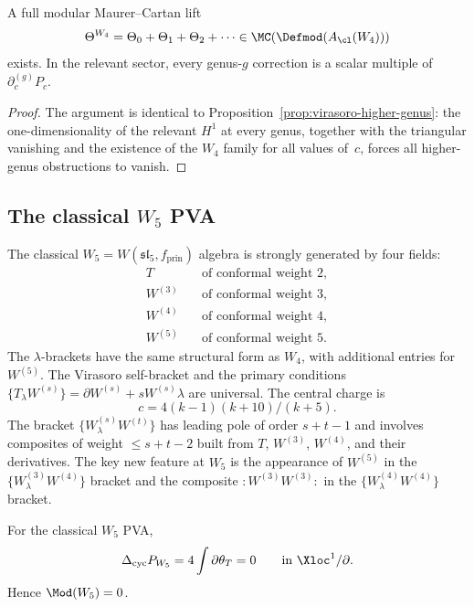 \begin{corollary}
A full modular Maurer--Cartan lift
\[
\Theta^{W_4} = \Theta_0 + \Theta_1 + \Theta_2 + \cdots
\in \MC(\Defmod(A_{\cl}(W_4)))
\]
exists. In the relevant sector, every genus-$g$ correction is a scalar
multiple of $\partial_c^{(g)} P_c$.
\end{corollary}

\begin{proof}
The argument is identical to Proposition~\ref{prop:virasoro-higher-genus}:
the one-dimensionality of the relevant $H^1$ at every genus, together with the
triangular vanishing and the existence of the $W_4$ family for all values of~$c$,
forces all higher-genus obstructions to vanish.
\end{proof}

\subsection{The classical $W_5$ PVA}

\begin{definition}
The classical $W_5 = W(\mathfrak{sl}_5, f_{\mathrm{prin}})$ algebra is
strongly generated by four fields:
\begin{align}
T &\quad\text{of conformal weight }2,\\
W^{(3)} &\quad\text{of conformal weight }3,\\
W^{(4)} &\quad\text{of conformal weight }4,\\
W^{(5)} &\quad\text{of conformal weight }5.
\end{align}
The $\lambda$-brackets have the same structural form as $W_4$, with
additional entries for $W^{(5)}$. The Virasoro self-bracket and the
primary conditions $\{T_\lambda W^{(s)}\} = \partial W^{(s)} + sW^{(s)}\lambda$
are universal. The central charge is
\[
c = 4(k-1)(k+10)/(k+5).
\]
The bracket $\{W^{(s)}_\lambda W^{(t)}\}$ has leading pole of order
$s + t - 1$ and involves composites of weight $\le s + t - 2$ built from
$T$, $W^{(3)}$, $W^{(4)}$, and their derivatives. The key new feature
at $W_5$ is the appearance of $W^{(5)}$ in the $\{W^{(3)}_\lambda W^{(4)}\}$
bracket and the composite ${:}W^{(3)}W^{(3)}{:}$ in the
$\{W^{(4)}_\lambda W^{(4)}\}$ bracket.
\end{definition}

\begin{theorem}
For the classical $W_5$ PVA,
\[
\Delta_{\mathrm{cyc}} P_{W_5} = 4\int\partial\theta_T = 0
\qquad\text{in }\Xloc^1/\partial.
\]
Hence $\Mod(W_5) = 0$.
\end{theorem}

